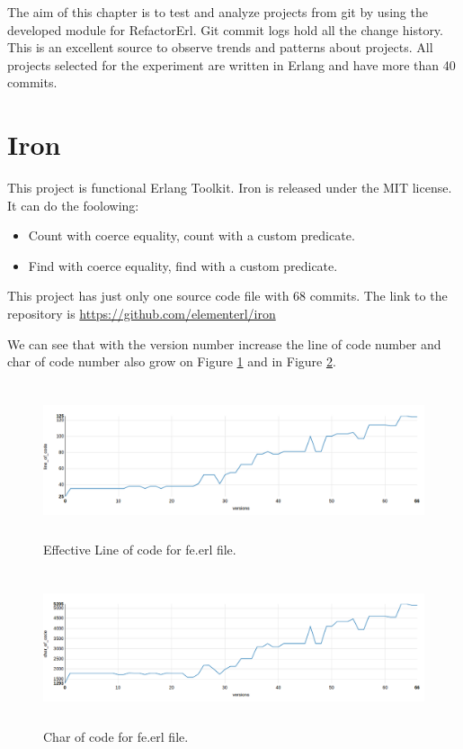 The aim of this chapter is to test and analyze projects from git by using the developed module for RefactorErl. Git commit logs hold all the change history. This is an excellent source to observe trends and patterns about projects. All projects selected for the experiment are written in Erlang and have more than 40 commits.

\section{Iron}

This project is functional Erlang Toolkit. Iron is released under the MIT license. It can do the foolowing:
\begin{itemize}
	\item Count with coerce equality, count with a custom predicate.
	\item Find with coerce equality, find with a custom predicate.
\end{itemize}

This project has just only one source code file with 68 commits. The link to the repository is \url{https://github.com/elementerl/iron}

We can see that with the version number increase the line of code number and char of code number also grow on Figure \ref{fig:loc_iron} and in Figure \ref{fig:char_iron}.

\begin{figure}[h]
	\centering
	\includegraphics[height=45mm]{figures/loc_iron.png}
	\caption{Effective Line of code for fe.erl file.}
	\label{fig:loc_iron}
\end{figure}

\begin{figure}[h]
	\centering
	\includegraphics[height=45mm]{figures/char_iron.png}
	\caption{Char of code for fe.erl file.}
	\label{fig:char_iron}
\end{figure}

